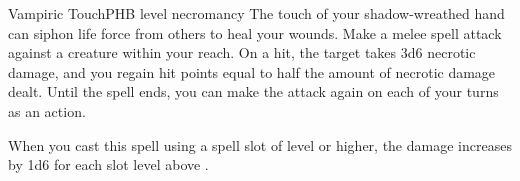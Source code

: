 \begin{spell}{Vampiric Touch}{PHB}{ level necromancy}
{
}
The touch of your shadow-wreathed hand can siphon life
force from others to heal your wounds. Make a melee
spell attack against a creature within your reach. On
a hit, the target takes 3d6 necrotic damage, and you
regain hit points equal to half the amount of necrotic
damage dealt. Until the spell ends, you can make the
attack again on each of your turns as an action.

 When you cast this spell using a
spell slot of  level or higher, the damage increases by
1d6 for each slot level above .
\end{spell}